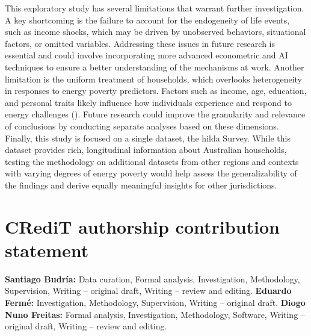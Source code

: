 \documentclass[preprint,authoryear,12pt]{elsarticle}
\newcommand{\citeTwo}[1]{(\cite{#1})}
\begin{document}
This exploratory study has several limitations that warrant further investigation. A key shortcoming is the failure to account for the endogeneity of life events, such as income shocks, which may be driven by unobserved behaviors, situational factors, or omitted variables. Addressing these issues in future research is essential and could involve incorporating more advanced econometric and AI techniques to ensure a better understanding of the mechanisms at work. Another limitation is the uniform treatment of households, which overlooks heterogeneity in responses to energy poverty predictors. Factors such as income, age, education, and personal traits likely influence how individuals experience and respond to energy challenges \citeTwo{CNQX22}. Future research could improve the granularity and relevance of conclusions by conducting separate analyses based on these dimensions. Finally, this study is focused on a single dataset, the \Gls{hilda} Survey. While this dataset provides rich, longitudinal information about Australian households, testing the methodology on additional datasets from other regions and contexts with varying degrees of energy poverty would help assess the generalizability of the findings and derive equally meaningful insights for other jurisdictions.




\section*{CRediT authorship contribution statement}

\textbf{Santiago Budría:} Data curation, Formal analysis, Investigation, Methodology, Supervision, Writing – original draft, Writing – review and editing. \textbf{Eduardo Fermé:} Investigation, Methodology, Supervision, Writing – original draft. \textbf{Diogo Nuno Freitas:} Formal analysis, Investigation, Methodology, Software, Writing – original draft, Writing – review and editing.

\end{document}
